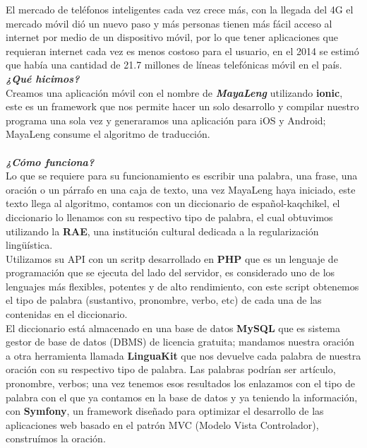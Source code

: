 \documentclass[a4paper,openright,11pt]{article}
\begin{document}
El mercado de teléfonos inteligentes cada vez crece más, con la llegada del 4G el mercado móvil dió un nuevo paso y más personas tienen más fácil acceso al internet por medio de un dispositivo móvil, por lo que tener aplicaciones que requieran internet cada vez es menos costoso para el usuario, en el 2014 se estimó que había una cantidad de 21.7 millones de líneas telefónicas móvil en el país.\\

\textbf{\textit{¿Qué hicimos?}}\\
Creamos una aplicación móvil con el nombre de \textbf{\textit{MayaLeng}} utilizando \textbf{ionic}, este es un framework que nos permite hacer un solo desarrollo y compilar nuestro programa una sola vez y generaramos una aplicación para iOS y Android; MayaLeng consume el algoritmo de traducción.\\\\

\textbf{\textit{¿Cómo funciona?}}\\
Lo que se requiere para su funcionamiento es escribir una palabra, una frase, una oración o un párrafo en una caja de texto, una vez MayaLeng haya iniciado, este texto llega al algoritmo, contamos con un diccionario de español-kaqchikel, el diccionario lo llenamos con su respectivo tipo de palabra, el cual obtuvimos utilizando la \textbf{RAE}, una institución cultural dedicada a la regularización lingüística.\\ 
Utilizamos su API con un scritp desarrollado en \textbf{PHP} que es un lenguaje de programación que se ejecuta del lado del servidor, es considerado uno de los lenguajes más flexibles, potentes y de alto rendimiento,  con este script obtenemos el tipo de palabra (sustantivo, pronombre, verbo, etc) de cada una de las contenidas en el diccionario.\\ 
El diccionario está almacenado en una base de datos \textbf{MySQL} que es sistema gestor de base de datos (DBMS) de licencia gratuita; mandamos nuestra oración a otra herramienta llamada \textbf{LinguaKit} que nos devuelve cada palabra de nuestra oración con su respectivo tipo de palabra. Las palabras podrían ser artículo, pronombre, verbos; una vez tenemos esos resultados los enlazamos con el tipo de palabra con el que ya contamos en la base de datos y ya teniendo la información, con \textbf{Symfony}, un framework diseñado para optimizar el desarrollo de las aplicaciones web basado en el patrón MVC (Modelo Vista Controlador), construímos la oración.\\\\
\end{document}
